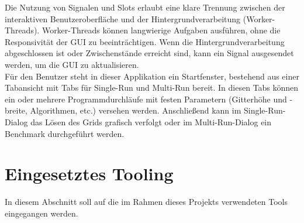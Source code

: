 Die Nutzung von Signalen und Slots erlaubt eine klare Trennung zwischen der interaktiven Benutzeroberfläche und der Hintergrundverarbeitung (Worker-Threads).
Worker-Threads können langwierige Aufgaben ausführen, ohne die Responsivität der GUI zu beeinträchtigen.
Wenn die Hintergrundverarbeitung abgeschlossen ist oder Zwischenstände erreicht sind, kann ein Signal ausgesendet werden, um die GUI zu aktualisieren. \cite{Qt52024}\\
Für den Benutzer steht in dieser Applikation ein Startfenster, bestehend aus einer Tabansicht mit Tabs für Single-Run und Multi-Run bereit.
In diesen Tabs können ein oder mehrere Programmdurchläufe mit festen Parametern (Gitterhöhe und -breite, Algorithmen, etc.) versehen werden.
Anschließend kann im Single-Run-Dialog das Lösen des Grids grafisch verfolgt oder im Multi-Run-Dialog ein Benchmark durchgeführt werden.

\chapter{Eingesetztes Tooling}
\label{ch:tooling}
In diesem Abschnitt soll auf die im Rahmen dieses Projekts verwendeten Tools eingegangen werden.
